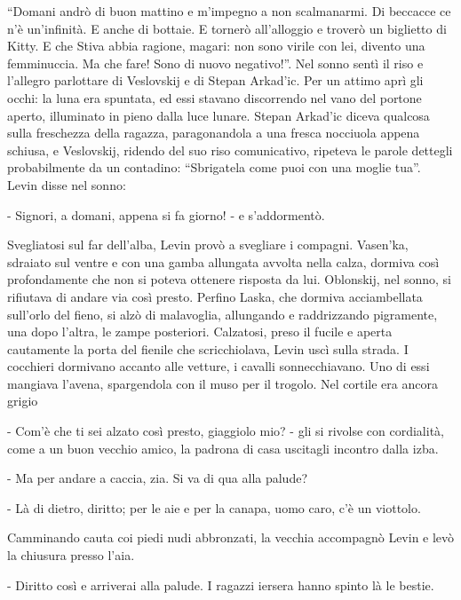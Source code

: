 ``Domani andrò di buon mattino e m'impegno a non scalmanarmi. Di beccacce ce n'è un'infinità. E anche di bottaie. E tornerò all'alloggio e troverò un biglietto di Kitty. E che Stiva abbia ragione, magari: non sono virile con lei, divento una femminuccia. Ma che fare! Sono di nuovo negativo!''. Nel sonno sentì il riso e l'allegro parlottare di Veslovskij e di Stepan Arkad'ic. Per un attimo aprì gli occhi: la luna era spuntata, ed essi stavano discorrendo nel vano del portone aperto, illuminato in pieno dalla luce lunare. Stepan Arkad'ic diceva qualcosa sulla freschezza della ragazza, paragonandola a una fresca nocciuola appena schiusa, e Veslovskij, ridendo del suo riso comunicativo, ripeteva le parole dettegli probabilmente da un contadino: ``Sbrigatela come puoi con una moglie tua''. Levin disse nel sonno: 

- Signori, a domani, appena si fa giorno! - e s'addormentò. 

\label{xii-5} 

Svegliatosi sul far dell'alba, Levin provò a svegliare i compagni. Vasen'ka, sdraiato sul ventre e con una gamba allungata avvolta nella calza, dormiva così profondamente che non si poteva ottenere risposta da lui. Oblonskij, nel sonno, si rifiutava di andare via così presto. Perfino Laska, che dormiva acciambellata sull'orlo del fieno, si alzò di malavoglia, allungando e raddrizzando pigramente, una dopo l'altra, le zampe posteriori. Calzatosi, preso il fucile e aperta cautamente la porta del fienile che scricchiolava, Levin uscì sulla strada. I cocchieri dormivano accanto alle vetture, i cavalli sonnecchiavano. Uno di essi mangiava l'avena, spargendola con il muso per il trogolo. Nel cortile era ancora grigio 

- Com'è che ti sei alzato così presto, giaggiolo mio? - gli si rivolse con cordialità, come a un buon vecchio amico, la padrona di casa uscitagli incontro dalla izba. 

- Ma per andare a caccia, zia. Si va di qua alla palude? 

- Là di dietro, diritto; per le aie e per la canapa, uomo caro, c'è un viottolo. 

Camminando cauta coi piedi nudi abbronzati, la vecchia accompagnò Levin e levò la chiusura presso l'aia. 

- Diritto così e arriverai alla palude. I ragazzi iersera hanno spinto là le bestie. 

